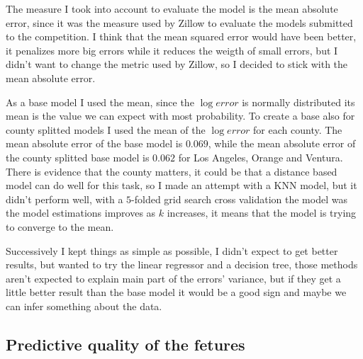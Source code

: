 The measure I took into account to evaluate the model is the mean absolute error, since it was the measure used by Zillow to evaluate the models submitted to the competition. I think that the mean squared error would have been better, it penalizes more big errors while it reduces the weigth of small errors, but I didn't want to change the metric used by Zillow, so I decided to stick with the mean absolute error.

As a base model I used the mean, since the $\log error$ is normally distributed its mean is the value we can expect with most probability. To create a base also for county splitted models I used the mean of the $\log error$ for each county. The mean absolute error of the base model is $0.069$, while the mean absolute error of the county splitted base model is $0.062$ for Los Angeles, Orange and Ventura. There is evidence that the county matters, it could be that a distance based model can do well for this task, so I made an attempt with a KNN model, but it didn't perform well, with a $5$-folded grid search cross validation the model was the model estimations improves as $k$ increases, it means that the model is trying to converge to the mean.

Successively I kept things as simple as possible, I didn't expect to get better results, but wanted to try the linear regressor and a decision tree, those methods aren't expected to explain main part of the errors' variance, but if they get a little better result than the base model it would be a good sign and maybe we can infer something about the data.

\subsection{Predictive quality of the fetures}